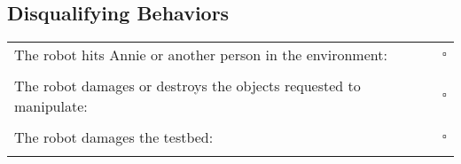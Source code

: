 \subsection*{Disqualifying Behaviors}
\begin{tabular}{ l c}

The robot hits Annie or another person in the environment: & $\square$ \\ \\

The robot damages or destroys the objects requested to manipulate: & $\square$ \\ \\

The robot damages the testbed: & $\square$ \\ \\

\end{tabular}



